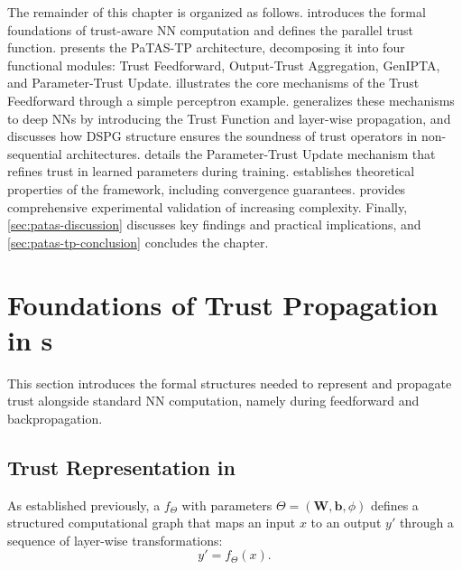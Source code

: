 The remainder of this chapter is organized as follows.  introduces the formal foundations of trust-aware \ac{NN} computation and defines the parallel trust function.  presents the \ac{PaTAS-TP} architecture, decomposing it into four functional modules: Trust Feedforward, Output-Trust Aggregation, \ac{GenIPTA}, and Parameter-Trust Update.  illustrates the core mechanisms of the Trust Feedforward through a simple perceptron example.  generalizes these mechanisms to deep \acp{NN} by introducing the Trust Function and layer-wise propagation, and discusses how \ac{DSPG} structure ensures the soundness of trust operators in non-sequential architectures.  details the Parameter-Trust Update mechanism that refines trust in learned parameters during training.  establishes theoretical properties of the framework, including convergence guarantees. \DIFaddbegin {} \DIFaddend {} provides comprehensive experimental validation \DIFdelbegin {}\DIFdelend of increasing complexity\DIFaddbegin {}\DIFaddend . Finally, \cref{sec:patas-discussion} discusses key findings and practical implications, and \cref{sec:patas-tp-conclusion} concludes the chapter.

\section{Foundations of Trust Propagation in s}
\label{sec:trust_foundations}
This section introduces the formal structures needed to represent and propagate trust alongside standard \ac{NN} computation, namely during feedforward and backpropagation.

\subsection{Trust Representation in }
As established previously, a  $f_\Theta$ with parameters $\Theta = (\mathbf{W}, \mathbf{b}, \phi)$ defines a structured computational graph that maps an input $x$ to an output $y'$ through a sequence of layer-wise transformations:
\[
y' = f_\Theta(x).
\]

